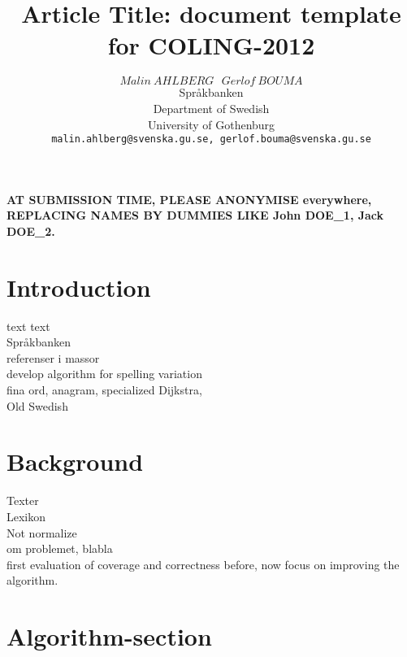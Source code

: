 \documentclass[10pt,a5paper,twoside]{article}
\title{Article Title: document template for COLING-2012}
\author{$Malin~AHLBERG~~~Gerlof~BOUMA$\\
{\small  
  Språkbanken \\
  Department of Swedish \\
  University of Gothenburg \\
  \texttt{malin.ahlberg@svenska.gu.se, gerlof.bouma@svenska.gu.se} \\ 
}}
\begin{document}
\maketitle

\textbf{AT SUBMISSION TIME, PLEASE ANONYMISE everywhere, REPLACING NAMES BY DUMMIES LIKE John DOE\_1, Jack DOE\_2.}






\newpage

\section{Introduction}
text text\\
Språkbanken \\
referenser i massor\\
develop algorithm for spelling variation \\
fina ord, anagram, specialized Dijkstra, \\
Old Swedish


\section{Background}
Texter \\
Lexikon \\
Not normalize \\
om problemet, blabla \\ 
first evaluation of coverage and correctness before,
now focus on improving the algorithm.


\section{Algorithm-section}
\end{document}

